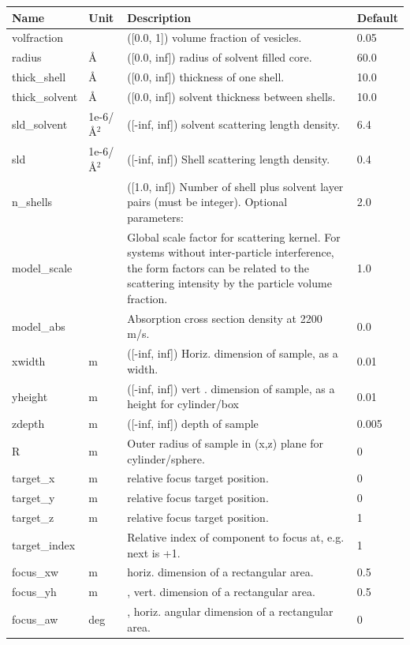 \begin{longtable}{p{}p{}p{}p{}}
\toprule
\textbf{Name} & \textbf{Unit} & \textbf{Description} & \textbf{Default} \\
\midrule
\endhead
volfraction &  & ([0.0, 1]) volume fraction of vesicles. & 0.05 \\
radius & \AA{} & ([0.0, inf]) radius of solvent filled core. & 60.0 \\
thick\_shell & \AA{} & ([0.0, inf]) thickness of one shell. & 10.0 \\
thick\_solvent & \AA{} & ([0.0, inf]) solvent thickness between shells. & 10.0 \\
sld\_solvent & 1e-6/\AA{}$^{2}$ & ([-inf, inf]) solvent scattering length density. & 6.4 \\
sld & 1e-6/\AA{}$^{2}$ & ([-inf, inf]) Shell scattering length density. & 0.4 \\
n\_shells &  & ([1.0, inf]) Number of shell plus solvent layer pairs (must be integer). Optional parameters: & 2.0 \\
model\_scale &   & Global scale factor for scattering kernel. For systems without inter-particle interference, the form factors can be related to the scattering intensity by the particle volume fraction. & 1.0 \\
model\_abs &   & Absorption cross section density at 2200 m/s. & 0.0 \\
xwidth & m & ([-inf, inf]) Horiz. dimension of sample, as a width. & 0.01 \\
yheight & m & ([-inf, inf]) vert . dimension of sample, as a height for cylinder/box & 0.01 \\
zdepth & m & ([-inf, inf]) depth of sample & 0.005 \\
R & m & Outer radius of sample in (x,z) plane for cylinder/sphere. & 0 \\
target\_x & m & relative focus target position. & 0 \\
target\_y & m & relative focus target position. & 0 \\
target\_z & m & relative focus target position. & 1 \\
target\_index &   & Relative index of component to focus at, e.g. next is +1. & 1 \\
focus\_xw & m & horiz. dimension of a rectangular area. & 0.5 \\
focus\_yh & m & , vert. dimension of a rectangular area. & 0.5 \\
focus\_aw & deg & , horiz. angular dimension of a rectangular area. & 0 \\

\end{longtable}
